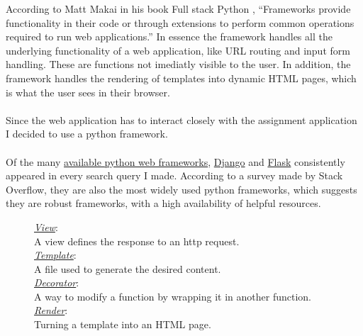 According to Matt Makai in his book Full stack Python \cite{fstack_framework}, ``Frameworks provide functionality in their code or through extensions to perform common operations required to run web applications.''
In essence the framework handles all the underlying functionality of a web application, like URL routing and input form handling. These are functions not imediatly visible to the user. In addition, the framework handles the rendering of templates into dynamic HTML pages, which is what the user sees in their browser.\\\\
Since the web application has to interact closely with the assignment application I decided to use a python framework.\\\\
Of the many \href{https://wiki.python.org/moin/WebFrameworks}{available python web frameworks}, \href{https://www.djangoproject.com/}{Django} and \href{https://flask.palletsprojects.com/en/2.2.x/}{Flask} consistently appeared in every search query I made. According to a survey \cite{framework_survey} made by Stack Overflow, they are also the most widely used python frameworks, which suggests they are robust frameworks, with a high availability of helpful resources.
\begin{figure}[h]
	\begin{tcolorbox}[title={Terminology in regards to python web frameworks},colbacktitle=gray]
		\underline{\textit{View}}:\\A view defines the response to an http request.\\
		\underline{\textit{Template}}:\\A file used to generate the desired content.\\
		\underline{\textit{Decorator}}:\\A way to modify a function by wrapping it in another function.\\
		\underline{\textit{Render}}:\\Turning a template into an HTML page.\\
	\end{tcolorbox}
\label{text:termin_framework}
\end{figure}\\

